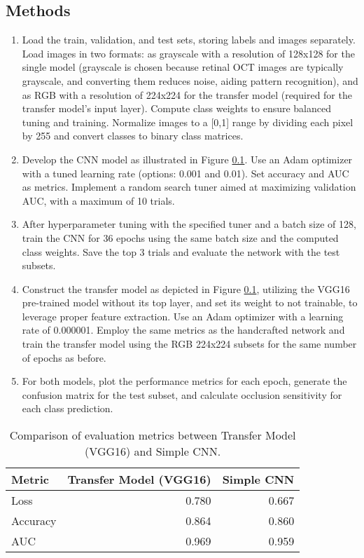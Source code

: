 \documentclass[a4paper,12pt]{article}
\begin{document}
\subsection{Methods}
\begin{enumerate}
    \item Load the train, validation, and test sets, storing labels and images separately. Load images in two formats: as grayscale with a resolution of 128x128 for the single model (grayscale is chosen because retinal OCT images are typically grayscale, and converting them reduces noise, aiding pattern recognition), and as RGB with a resolution of 224x224 for the transfer model (required for the transfer model's input layer). Compute class weights to ensure balanced tuning and training. Normalize images to a [0,1] range by dividing each pixel by 255 and convert classes to binary class matrices.
    \item Develop the CNN model as illustrated in Figure \ref{}. Use an Adam optimizer with a tuned learning rate (options: 0.001 and 0.01). Set accuracy and AUC as metrics. Implement a random search tuner aimed at maximizing validation AUC, with a maximum of 10 trials.
    \item After hyperparameter tuning with the specified tuner and a batch size of 128, train the CNN for 36 epochs using the same batch size and the computed class weights. Save the top 3 trials and evaluate the network with the test subsets.
    \item Construct the transfer model as depicted in Figure \ref{}, utilizing the VGG16 pre-trained model without its top layer, and set its weight to not trainable, to leverage proper feature extraction. Use an Adam optimizer with a learning rate of 0.000001. Employ the same metrics as the handcrafted network and train the transfer model using the RGB 224x224 subsets for the same number of epochs as before.
    \item For both models, plot the performance metrics for each epoch, generate the confusion matrix for the test subset, and calculate occlusion sensitivity for each class prediction.

\end{enumerate}

\begin{table}[h]
\centering
\begin{tabular}{lrr}
\toprule
Metric & Transfer Model (VGG16) & Simple CNN \\
\midrule
Loss & 0.780 & 0.667 \\
Accuracy & 0.864 & 0.860 \\
AUC & 0.969 & 0.959 \\
\bottomrule
\end{tabular}
\caption{
    Comparison of evaluation metrics between Transfer Model (VGG16) and Simple CNN.
}
\label{tab:comparison-results}
\end{table}
\end{document}
